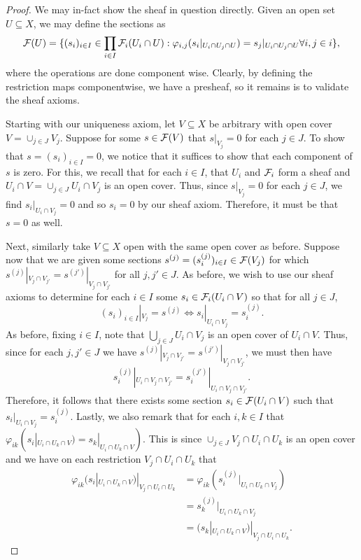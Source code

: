 \documentclass[12pt]{article}
\begin{document}
\begin{proof}
    We may in-fact show the sheaf in question directly.
    Given an open set $U \subseteq X$, we may define the sections as
    \[
        \mathcal{F}(U) = \{ 
            (s_i)_{i \in I} \in \prod_{i \in I} \mathcal{F}_i(U_i \cap U): 
            \varphi_{i, j}(s_i|_{U_i \cap U_j \cap U}) = s_j|_{U_i \cap U_j \cap U} \forall i, j \in i
        \},
    \]
    where the operations are done component wise.
    Clearly, by defining the restriction maps componentwise,
    we have a presheaf, so it remains is to validate the sheaf axioms.

    Starting with our uniqueness axiom, let $V \subseteq X$ be arbitrary with open cover $V = \cup_{j \in J} V_j$.
    Suppose for some $s \in \mathcal{F}(V)$ that $s|_{V_j} = 0$ for each $j \in J$.
    To show that $s = (s_i)_{i \in I}= 0$, we notice that it suffices to show that each component of $s$ is zero.
    For this, we recall that for each $i \in I$, that $U_i$ and $\mathcal{F}_i$ form a sheaf and $U_i \cap V = \cup_{j \in J} U_i \cap V_j$ is an open cover.
    Thus, since $s|_{V_j} = 0$ for each $j \in J$, we find $s_i|_{U_i \cap V_j} = 0$ and so $s_i = 0$ by our sheaf axiom.
    Therefore, it must be that $s = 0$ as well.

    Next, similarly take $V \subseteq X$ open with the same open cover as before. 
    Suppose now that we are given some sections $s^{(j)} = (s^{(j)}_i)_{i \in I} \in \mathcal{F}(V_j)$ for which $s^{(j)}|_{V_j \cap V_{j'}} = s^{(j')}|_{V_j \cap V_{j'}}$ for all $j, j' \in J$.
    As before, we wish to use our sheaf axioms to determine for each $i \in I$ some $s_i \in \mathcal{F}_i(U_i \cap V)$ so that for all $j \in J$,
    \[
        (s_i)_{i \in I}|_{V_j} = s^{(j)}
        \iff s_i|_{U_i \cap V_j} = s^{(j)}_i.
    \]
    As before, fixing $i \in I$, note that $\bigcup_{j \in J} U_i \cap V_j$ is an open cover of $U_i \cap V$.
    Thus, since for each $j, j' \in J$ we have $s^{(j)}|_{V_j \cap V_{j'}} = s^{(j')}|_{V_j \cap V_{j'}}$, we must then have
    \[
        s^{(j)}_i|_{U_i \cap V_j \cap V_{{j'}}}
        = s_i^{(j')}|_{U_i \cap V_j \cap V_{{j'}}}.
    \]
    Therefore, it follows that there exists some section $s_i \in \mathcal{F}(U_i \cap V)$ such that $s_i|_{U_i \cap V_j} = s^{(j)}_i$.
    Lastly, we also remark that for each $i, k \in I$ that $\varphi_{ik}(s_i|_{U_i \cap U_k \cap V}) = s_k|_{U_i \cap U_k \cap V})$.
    This is since $\cup_{j \in J} V_j \cap U_i \cap U_k$ is an open cover and we have on each restriction $V_j \cap U_i \cap U_k$ that
    \begin{align*}
        \varphi_{ik}(s_i|_{U_i \cap U_k \cap V})|_{V_j \cap U_i \cap U_k}
        & = \varphi_{ik}(s^{(j)}_i|_{U_i \cap U_k \cap V_j}) \\
        & = s^{(j)}_k|_{U_i \cap U_k \cap V_j} \\
        & =(s_k|_{U_i \cap U_k \cap V})|_{V_j \cap U_i \cap U_k}.
    \end{align*}


\end{proof}
\end{document}

